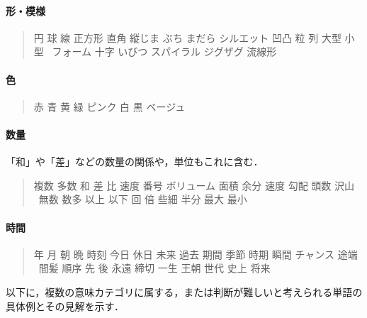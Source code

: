 \documentclass[a4j,titlepage]{jarticle}
\begin{document}
\paragraph{形・模様}

\begin{quote}
円 球 線 正方形 直角 縦じま ぶち まだら シルエット 凹凸 粒 列 大型 小型
\ フォーム 十字 いびつ スパイラル ジグザグ 流線形
\end{quote}


\paragraph{色}

\begin{quote}
赤 青 黄 緑 ピンク 白 黒 ベージュ
\end{quote}


\paragraph{数量}

「和」や「差」などの数量の関係や，単位もこれに含む．

\begin{quote}
複数 多数 和 差 比 速度 番号 ボリューム 面積 余分 速度 勾配 頭数 沢山 
\ 無数 数多 以上 以下 回 倍 些細 半分 最大 最小
\end{quote}


\paragraph{時間}

\begin{quote}
年 月 朝 晩 時刻 今日 休日 未来 過去 期間 季節 時期 瞬間 チャンス 途端
\ 間髪 順序 先 後 永遠 締切 一生 王朝 世代 史上 将来
\end{quote}


\vspace{10pt}

以下に，複数の意味カテゴリに属する，または判断が難しいと考えられる単語の
具体例とその見解を示す．
\end{document}
